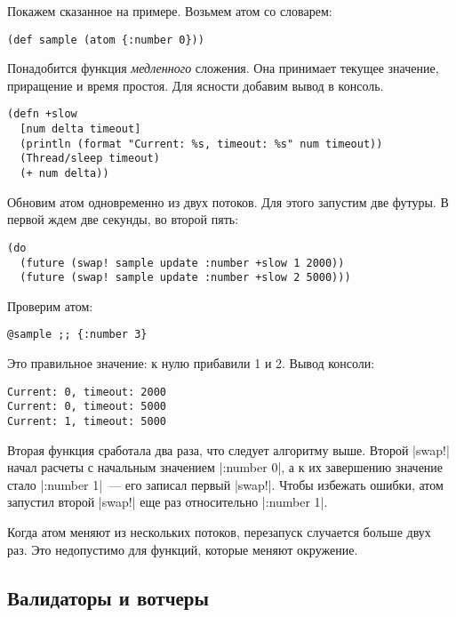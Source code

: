 
Покажем сказанное на примере. Возьмем атом со словарем:

\begin{verbatim}
(def sample (atom {:number 0}))
\end{verbatim}

Понадобится функция \emph{медленного} сложения. Она принимает текущее значение,
приращение и время простоя. Для ясности добавим вывод в консоль.

\begin{verbatim}
(defn +slow
  [num delta timeout]
  (println (format "Current: %s, timeout: %s" num timeout))
  (Thread/sleep timeout)
  (+ num delta))
\end{verbatim}

Обновим атом одновременно из двух потоков. Для этого запустим две футуры. В
первой ждем две секунды, во второй пять:

\begin{verbatim}
(do
  (future (swap! sample update :number +slow 1 2000))
  (future (swap! sample update :number +slow 2 5000)))
\end{verbatim}

\noindent
Проверим атом:

\begin{verbatim}
@sample ;; {:number 3}
\end{verbatim}

\noindent
Это правильное значение: к нулю прибавили 1 и 2. Вывод консоли:

\begin{verbatim}
Current: 0, timeout: 2000
Current: 0, timeout: 5000
Current: 1, timeout: 5000
\end{verbatim}

Вторая функция сработала два раза, что следует алгоритму выше. Второй
\spverb|swap!| начал расчеты с начальным значением \spverb|{:number 0}|, а к их
завершению значение стало \spverb|{:number 1}|~--- его записал первый
\spverb|swap!|. Чтобы избежать ошибки, атом запустил второй \spverb|swap!| еще
раз относительно \spverb|{:number 1}|.

Когда атом меняют из нескольких потоков, перезапуск случается больше двух
раз. Это недопустимо для функций, которые меняют окружение.


\subsection{Валидаторы и вотчеры}

